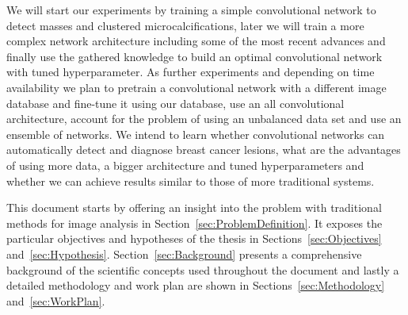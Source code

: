 We will start our experiments by training a simple convolutional network to detect masses and clustered microcalcifications, later we will train a more complex network architecture including some of the most recent advances and finally use the gathered knowledge to build an optimal convolutional network with tuned hyperparameter. As further experiments and depending on time availability we plan to pretrain a convolutional network with a different image database and fine-tune it using our database, use an all convolutional architecture, account for the problem of using an unbalanced data set and use an ensemble of networks. We intend to learn whether convolutional networks can automatically detect and diagnose breast cancer lesions, what are the advantages of using more data, a bigger architecture and tuned hyperparameters and whether we can achieve results similar to those of more traditional systems.

This document starts by offering an insight into the problem with traditional methods for image analysis in Section~\ref{sec:ProblemDefinition}. It exposes the particular objectives and hypotheses of the thesis in Sections~\ref{sec:Objectives} and~\ref{sec:Hypothesis}. Section~\ref{sec:Background} presents a comprehensive background of the scientific concepts used throughout the document and lastly a detailed methodology and work plan are shown in Sections~\ref{sec:Methodology} and~\ref{sec:WorkPlan}.

